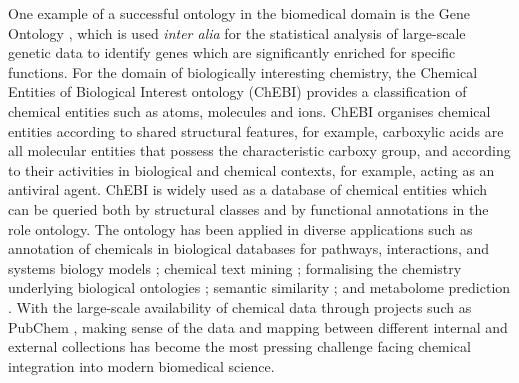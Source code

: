 \documentclass[10pt]{bmc_article}
\newenvironment{bmcformat}{\baselineskip20pt\sloppy\setboolean{publ}{false}}{\baselineskip20pt\sloppy}
\begin{document}
\begin{bmcformat}
One example of a successful ontology in the biomedical domain is the Gene Ontology \cite{go2000}, which is used \textit{inter alia} for the statistical analysis of large-scale genetic data to identify genes which are significantly enriched for specific functions.  For the domain of biologically interesting chemistry, the Chemical Entities of Biological Interest ontology (ChEBI) \cite{chebi2010} provides a classification of chemical entities such as atoms, molecules and ions.  ChEBI organises chemical entities according to shared structural features, for example, carboxylic acids are all molecular entities that possess the characteristic carboxy group, and according to their activities in biological and chemical contexts, for example, acting as an antiviral agent. ChEBI is widely used as a database of chemical entities which can be queried both by structural classes and by functional annotations in the role ontology. The ontology has been applied in diverse applications such as annotation of chemicals in biological databases for pathways, interactions, and systems biology models \cite{matthews2009,libiomodels2010,kerrien2007}; chemical text mining \cite{corbett2006}; formalising the chemistry underlying biological ontologies \cite{mungall2010}; semantic similarity \cite{couto2010}; and metabolome prediction \cite{swainston2010}. With the large-scale availability of chemical data through projects such as PubChem \cite{bolton2008}, making sense of the data and mapping between different internal and external collections has become the most pressing challenge facing chemical integration into modern biomedical science. 


\end{bmcformat}
\end{document}

